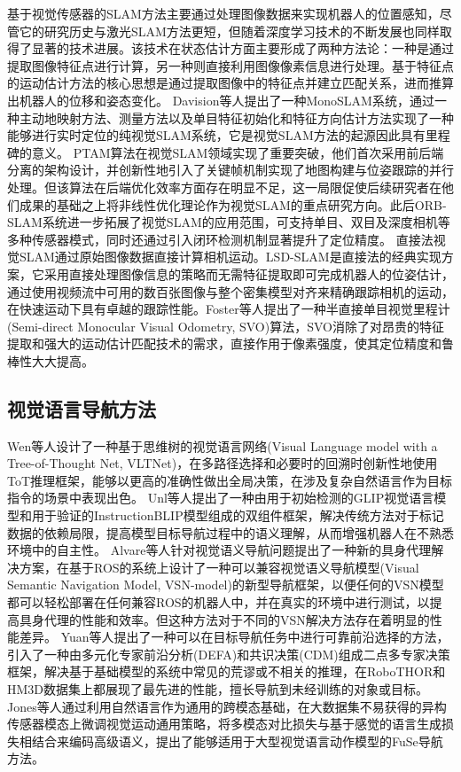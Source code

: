 	基于视觉传感器的SLAM方法主要通过处理图像数据来实现机器人的位置感知，尽管它的研究历史与激光SLAM方法更短，但随着深度学习技术的不断发展也同样取得了显著的技术进展。该技术在状态估计方面主要形成了两种方法论：一种是通过提取图像特征点进行计算，另一种则直接利用图像像素信息进行处理。基于特征点的运动估计方法的核心思想是通过提取图像中的特征点并建立匹配关系，进而推算出机器人的位移和姿态变化。
	Davision\cite{davison2007monoslam, davison2003real}等人提出了一种MonoSLAM系统，通过一种主动地映射方法、测量方法以及单目特征初始化和特征方向估计方法实现了一种能够进行实时定位的纯视觉SLAM系统，它是视觉SLAM方法的起源因此具有里程碑的意义。
	PTAM\cite{klein2007parallel}算法在视觉SLAM领域实现了重要突破，他们首次采用前后端分离的架构设计，并创新性地引入了关键帧机制实现了地图构建与位姿跟踪的并行处理。但该算法在后端优化效率方面存在明显不足，这一局限促使后续研究者在他们成果的基础之上将非线性优化理论作为视觉SLAM的重点研究方向。此后ORB-SLAM\cite{mur2015orb}系统进一步拓展了视觉SLAM的应用范围，可支持单目、双目及深度相机等多种传感器模式，同时还通过引入闭环检测机制显著提升了定位精度。
	直接法视觉SLAM通过原始图像数据直接计算相机运动。LSD-SLAM\cite{newcombe2011dtam}是直接法的经典实现方案，它采用直接处理图像信息的策略而无需特征提取即可完成机器人的位姿估计，通过使用视频流中可用的数百张图像与整个密集模型对齐来精确跟踪相机的运动，在快速运动下具有卓越的跟踪性能。Foster\cite{forster2014svo}等人提出了一种半直接单目视觉里程计(Semi-direct Monocular Visual Odometry, SVO)算法，SVO消除了对昂贵的特征提取和强大的运动估计匹配技术的需求，直接作用于像素强度，使其定位精度和鲁棒性大大提高。





\subsection{视觉语言导航方法}
	Wen\cite{wen2025zero}等人设计了一种基于思维树的视觉语言网络(Visual Language model with a Tree-of-Thought Net, VLTNet)，在多路径选择和必要时的回溯时创新性地使用ToT推理框架，能够以更高的准确性做出全局决策，在涉及复杂自然语言作为目标指令的场景中表现出色。
	Unl\cite{unlu2025reliable}等人提出了一种由用于初始检测的GLIP视觉语言模型和用于验证的InstructionBLIP模型组成的双组件框架，解决传统方法对于标记数据的依赖局限，提高模型目标导航过程中的语义理解，从而增强机器人在不熟悉环境中的自主性。
	Alvare\cite{gutierrez2025visual}等人针对视觉语义导航问题提出了一种新的具身代理解决方案，在基于ROS的系统上设计了一种可以兼容视觉语义导航模型(Visual Semantic Navigation Model, VSN-model)的新型导航框架，以便任何的VSN模型都可以轻松部署在任何兼容ROS的机器人中，并在真实的环境中进行测试，以提高具身代理的性能和效率。但这种方法对于不同的VSN解决方法存在着明显的性能差异。
	Yuan\cite{yuan2025exploring}等人提出了一种可以在目标导航任务中进行可靠前沿选择的方法，引入了一种由多元化专家前沿分析(DEFA)和共识决策(CDM)组成二点多专家决策框架，解决基于基础模型的系统中常见的荒谬或不相关的推理，在RoboTHOR和HM3D数据集上都展现了最先进的性能，擅长导航到未经训练的对象或目标。
	Jones\cite{jones2025beyond}等人通过利用自然语言作为通用的跨模态基础，在大数据集不易获得的异构传感器模态上微调视觉运动通用策略，将多模态对比损失与基于感觉的语言生成损失相结合来编码高级语义，提出了能够适用于大型视觉语言动作模型的FuSe导航方法。

